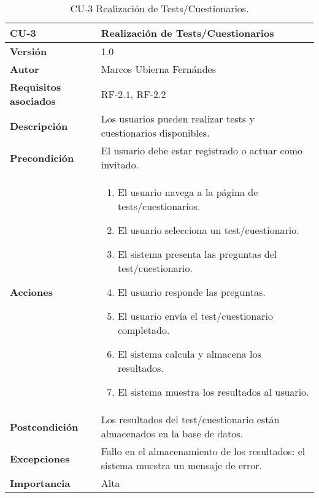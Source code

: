 \begin{table}[p]
	\centering
	\begin{tabularx}{\linewidth}{ p{} p{} }
		\toprule
		\textbf{CU-3}    & \textbf{Realización de Tests/Cuestionarios}\\
		\toprule
		\textbf{Versión}              & 1.0    \\
		\textbf{Autor}                & Marcos Ubierna Fernándes \\
		\textbf{Requisitos asociados} & RF-2.1, RF-2.2 \\
		\textbf{Descripción}          &Los usuarios pueden realizar tests y cuestionarios disponibles. \\
		\textbf{Precondición}         & El usuario debe estar registrado o actuar como invitado. \\
		\textbf{Acciones}             &
		\begin{enumerate}
			\def\labelenumi{\arabic{enumi}.}
			\tightlist
			\item El usuario navega a la página de tests/cuestionarios.
			\item El usuario selecciona un test/cuestionario.
                \item El sistema presenta las preguntas del test/cuestionario.
                \item El usuario responde las preguntas.
                \item El usuario envía el test/cuestionario completado.
                \item El sistema calcula y almacena los resultados.
                \item El sistema muestra los resultados al usuario.
		\end{enumerate}\\
		\textbf{Postcondición}        &  Los resultados del test/cuestionario están almacenados en la base de datos. \\
		\textbf{Excepciones}          & Fallo en el almacenamiento de los resultados: el sistema muestra un mensaje de error. \\
		\textbf{Importancia}          & Alta \\
		\bottomrule
	\end{tabularx}
	\caption{CU-3 Realización de Tests/Cuestionarios.}
\end{table}

